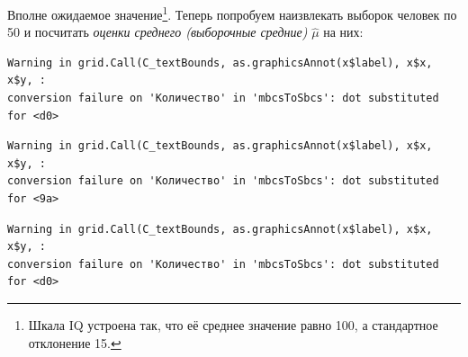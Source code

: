 \documentclass[
  letterpaper,
  DIV=11,
  numbers=noendperiod]{scrreprt}
\newenvironment{Shaded}{}{}
\newcommand{\AttributeTok}[1]{\textcolor[rgb]{0.84,0.23,0.29}{#1}}
\newcommand{\ConstantTok}[1]{\textcolor[rgb]{0.00,0.36,0.77}{#1}}
\newcommand{\ControlFlowTok}[1]{\textcolor[rgb]{0.84,0.23,0.29}{#1}}
\newcommand{\DecValTok}[1]{\textcolor[rgb]{0.00,0.36,0.77}{#1}}
\newcommand{\FunctionTok}[1]{\textcolor[rgb]{0.44,0.26,0.76}{#1}}
\newcommand{\NormalTok}[1]{\textcolor[rgb]{0.14,0.16,0.18}{#1}}
\newcommand{\OtherTok}[1]{\textcolor[rgb]{0.44,0.26,0.76}{#1}}
\newcommand{\SpecialCharTok}[1]{\textcolor[rgb]{0.00,0.36,0.77}{#1}}
\newcommand{\StringTok}[1]{\textcolor[rgb]{0.01,0.18,0.38}{#1}}
\theoremstyle{definition}
\theoremstyle{remark}
\begin{document}
Вполне ожидаемое значение\footnote{Шкала IQ устроена так, что её среднее
  значение равно 100, а стандартное отклонение 15.}. Теперь попробуем
наизвлекать выборок человек по 50 и посчитать \emph{оценки среднего
(выборочные средние)} \(\hat \mu\) на них:

\begin{Shaded}
\end{Shaded}

\begin{verbatim}
Warning in grid.Call(C_textBounds, as.graphicsAnnot(x$label), x$x, x$y, :
conversion failure on 'Количество' in 'mbcsToSbcs': dot substituted for <d0>
\end{verbatim}

\begin{verbatim}
Warning in grid.Call(C_textBounds, as.graphicsAnnot(x$label), x$x, x$y, :
conversion failure on 'Количество' in 'mbcsToSbcs': dot substituted for <9a>
\end{verbatim}

\begin{verbatim}
Warning in grid.Call(C_textBounds, as.graphicsAnnot(x$label), x$x, x$y, :
conversion failure on 'Количество' in 'mbcsToSbcs': dot substituted for <d0>
\end{verbatim}
\end{document}
